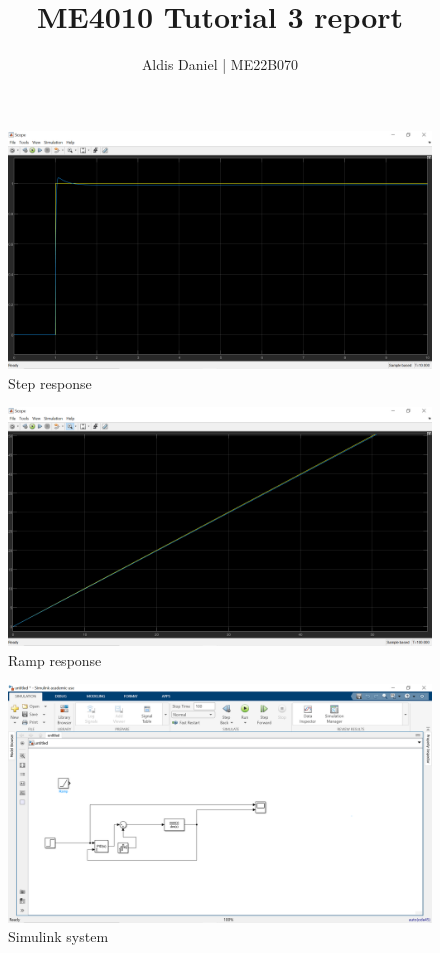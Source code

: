 \documentclass{article}
\author{Aldis Daniel | ME22B070}
\title{ME4010 Tutorial 3 report}
\begin{document}
\maketitle




\begin{figure}[h]
\includegraphics[width=\textwidth]{0.png}
\caption{Step response}
\end{figure}

\begin{figure}[h]
\includegraphics[width=\textwidth]{1.png}
\caption{Ramp response}
\end{figure}

\begin{figure}[h]
\includegraphics[width=\textwidth]{2.png}
\caption{Simulink system}
\end{figure}
\end{document}
